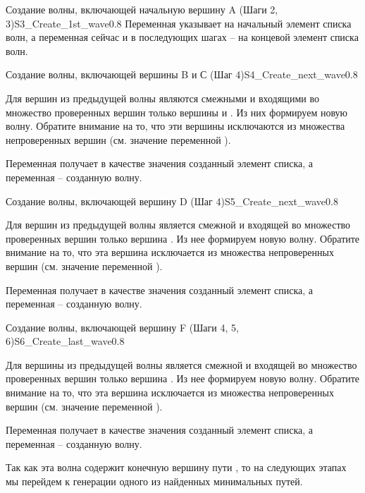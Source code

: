 \begin{itemize}
\begin{algostep}{Создание волны, включающей начальную вершину A (Шаги
    2, 3)}{S3_Create_1st_wave}{0.8}
  Переменная  указывает на начальный элемент
  списка волн, а переменная  сейчас и в
  последующих шагах – на концевой элемент списка волн.
\end{algostep}


\begin{algostep}{Создание волны, включающей вершины B и С (Шаг
    4)}{S4_Create_next_wave}{0.8}
  
  Для вершин из предыдущей волны являются смежными и входящими во
  множество проверенных вершин только вершины  и . Из них
  формируем новую волну. Обратите внимание на то, что эти вершины
  исключаются из множества непроверенных вершин (см. значение
  переменной ).

  Переменная  получает в качестве значения
  созданный элемент списка, а переменная  – созданную
  волну.
\end{algostep}


\begin{algostep}{Создание волны, включающей вершину D (Шаг
    4)}{S5_Create_next_wave}{0.8}

  Для вершин из предыдущей волны является смежной и входящей во
  множество проверенных вершин только вершина . Из нее формируем
  новую волну. Обратите внимание на то, что эта вершина исключается из
  множества непроверенных вершин (см. значение переменной
  ).

  Переменная  получает в качестве значения
  созданный элемент списка, а переменная  – созданную
  волну.
\end{algostep}


\begin{algostep}{Создание волны, включающей вершину F (Шаги 4, 5,
    6)}{S6_Create_last_wave}{0.8}

  Для вершины из предыдущей волны является смежной и входящей во
  множество проверенных вершин только вершина . Из нее формируем
  новую волну. Обратите внимание на то, что эта вершина исключается из
  множества непроверенных вершин (см. значение переменной
  ).

  Переменная  получает в качестве значения
  созданный элемент списка, а переменная  – созданную
  волну.

  Так как эта волна содержит конечную вершину пути , то на
  следующих этапах мы перейдем к генерации одного из найденных
  минимальных путей.
\end{algostep}



\end{itemize}
